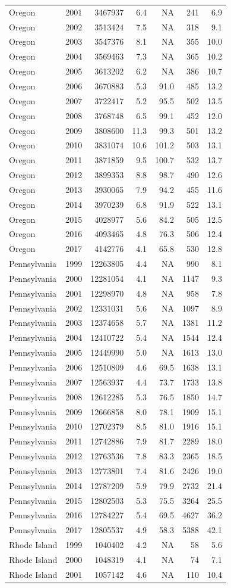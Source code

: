 \documentclass[
]{article}
\begin{document}
\begin{longtable}[]{@{}lrrrrrr@{}}
Oregon & 2001 & 3467937 & 6.4 & NA & 241 & 6.9\tabularnewline
Oregon & 2002 & 3513424 & 7.5 & NA & 318 & 9.1\tabularnewline
Oregon & 2003 & 3547376 & 8.1 & NA & 355 & 10.0\tabularnewline
Oregon & 2004 & 3569463 & 7.3 & NA & 365 & 10.2\tabularnewline
Oregon & 2005 & 3613202 & 6.2 & NA & 386 & 10.7\tabularnewline
Oregon & 2006 & 3670883 & 5.3 & 91.0 & 485 & 13.2\tabularnewline
Oregon & 2007 & 3722417 & 5.2 & 95.5 & 502 & 13.5\tabularnewline
Oregon & 2008 & 3768748 & 6.5 & 99.1 & 452 & 12.0\tabularnewline
Oregon & 2009 & 3808600 & 11.3 & 99.3 & 501 & 13.2\tabularnewline
Oregon & 2010 & 3831074 & 10.6 & 101.2 & 503 & 13.1\tabularnewline
Oregon & 2011 & 3871859 & 9.5 & 100.7 & 532 & 13.7\tabularnewline
Oregon & 2012 & 3899353 & 8.8 & 98.7 & 490 & 12.6\tabularnewline
Oregon & 2013 & 3930065 & 7.9 & 94.2 & 455 & 11.6\tabularnewline
Oregon & 2014 & 3970239 & 6.8 & 91.9 & 522 & 13.1\tabularnewline
Oregon & 2015 & 4028977 & 5.6 & 84.2 & 505 & 12.5\tabularnewline
Oregon & 2016 & 4093465 & 4.8 & 76.3 & 506 & 12.4\tabularnewline
Oregon & 2017 & 4142776 & 4.1 & 65.8 & 530 & 12.8\tabularnewline
Pennsylvania & 1999 & 12263805 & 4.4 & NA & 990 & 8.1\tabularnewline
Pennsylvania & 2000 & 12281054 & 4.1 & NA & 1147 & 9.3\tabularnewline
Pennsylvania & 2001 & 12298970 & 4.8 & NA & 958 & 7.8\tabularnewline
Pennsylvania & 2002 & 12331031 & 5.6 & NA & 1097 & 8.9\tabularnewline
Pennsylvania & 2003 & 12374658 & 5.7 & NA & 1381 & 11.2\tabularnewline
Pennsylvania & 2004 & 12410722 & 5.4 & NA & 1544 & 12.4\tabularnewline
Pennsylvania & 2005 & 12449990 & 5.0 & NA & 1613 & 13.0\tabularnewline
Pennsylvania & 2006 & 12510809 & 4.6 & 69.5 & 1638 & 13.1\tabularnewline
Pennsylvania & 2007 & 12563937 & 4.4 & 73.7 & 1733 & 13.8\tabularnewline
Pennsylvania & 2008 & 12612285 & 5.3 & 76.5 & 1850 & 14.7\tabularnewline
Pennsylvania & 2009 & 12666858 & 8.0 & 78.1 & 1909 & 15.1\tabularnewline
Pennsylvania & 2010 & 12702379 & 8.5 & 81.0 & 1916 & 15.1\tabularnewline
Pennsylvania & 2011 & 12742886 & 7.9 & 81.7 & 2289 & 18.0\tabularnewline
Pennsylvania & 2012 & 12763536 & 7.8 & 83.3 & 2365 & 18.5\tabularnewline
Pennsylvania & 2013 & 12773801 & 7.4 & 81.6 & 2426 & 19.0\tabularnewline
Pennsylvania & 2014 & 12787209 & 5.9 & 79.9 & 2732 & 21.4\tabularnewline
Pennsylvania & 2015 & 12802503 & 5.3 & 75.5 & 3264 & 25.5\tabularnewline
Pennsylvania & 2016 & 12784227 & 5.4 & 69.5 & 4627 & 36.2\tabularnewline
Pennsylvania & 2017 & 12805537 & 4.9 & 58.3 & 5388 & 42.1\tabularnewline
Rhode Island & 1999 & 1040402 & 4.2 & NA & 58 & 5.6\tabularnewline
Rhode Island & 2000 & 1048319 & 4.1 & NA & 74 & 7.1\tabularnewline
Rhode Island & 2001 & 1057142 & 4.6 & NA & 110 & 10.4\tabularnewline

\end{longtable}
\end{document}

